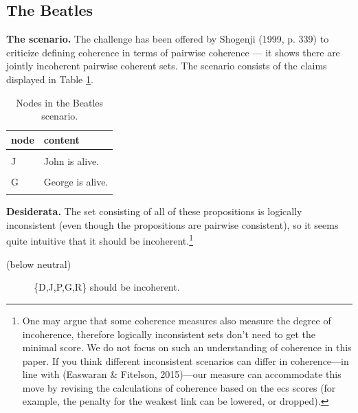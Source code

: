 \documentclass[
  10pt,
]{scrartcl}
\newcommand{\s}[1]{\textsf{#1}}
\begin{document}
\hypertarget{the-beatles}{%
\subsection{The Beatles}\label{the-beatles}}

\textbf{The scenario.} The challenge has been offered by Shogenji (1999, p. 339) to criticize defining coherence in terms of pairwise coherence --- it shows there are jointly incoherent pairwise coherent sets. The scenario consists of the claims displayed in Table \ref{tab:beatles}.

\begin{table}[H]

\caption{\label{tab:beatles}Nodes in the Beatles scenario.}
\centering
\begin{tabular}[t]{ll}
\toprule
node & content\\
\midrule
\cellcolor{gray!6}{D} & \cellcolor{gray!6}{Exactly one of the Beatles (John, Paul, George and Ringo) is dead.}\\
J & John is alive.\\
\cellcolor{gray!6}{P} & \cellcolor{gray!6}{Paul is alive.}\\
G & George is alive.\\
\cellcolor{gray!6}{R} & \cellcolor{gray!6}{Ringo is alive.}\\
\bottomrule
\end{tabular}
\end{table}

\noindent 

\textbf{Desiderata.} The set consisting of all of these propositions is logically inconsistent (even though the propositions are pairwise consistent), so it seems quite intuitive that it should be incoherent.\footnote{One may argue that some coherence measures also measure the degree of incoherence, therefore logically inconsistent sets don't need to get the minimal score. We do not focus on such an understanding of coherence in this paper. If you think different inconsistent scenarios can differ in coherence---in line with (Easwaran \& Fitelson, 2015)---our measure can accommodate this move by revising the calculations of coherence based on the \s{ecs} scores (for example, the penalty for the weakest link can be lowered, or dropped).}

\vspace{2mm}\begin{description}
    \item[(below neutral)] \{\s{D,J,P,G,R}\} should be incoherent.
\end{description}\vspace{2mm}
\end{document}

